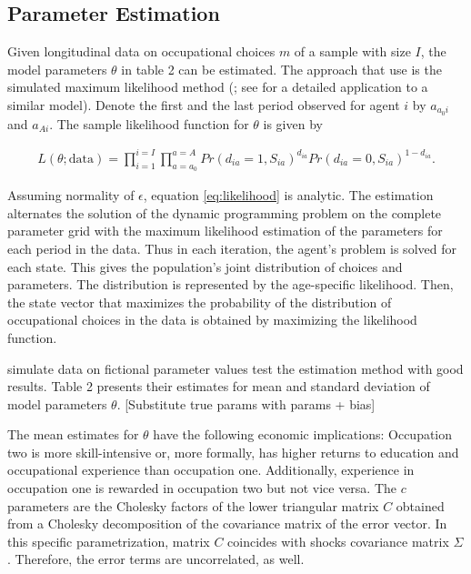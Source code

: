 \documentclass[a4paper,12pt]{article}
\begin{document}
\subsection{Parameter Estimation}

Given longitudinal data on occupational choices $m$ of a sample with size $I$, the model parameters $\theta$ in table 2 can be estimated. The approach that \cite{Keane.1994} use is the simulated maximum likelihood method (\cite{Albright.1977}; see \cite{Keane.2011d} for a detailed application to a similar model). Denote the first and the last period observed for agent $i$ by $a_{a_0 i}$ and $a_{A i}$. The sample likelihood function for $\theta$ is given by

\begin{align} \label{eq:likelihood}
L(\theta; \text{data}) = \prod_{i=1}^{i=I} \prod_{a=a_0}^{a=A} Pr(d_{ia}=1,S_{ia})^{d_{ia}}Pr(d_{ia}=0,S_{ia})^{1-d_{ia}}.
\end{align}

Assuming normality of $\epsilon$, equation \ref{eq:likelihood} is analytic. The estimation alternates the solution of the dynamic programming problem on the complete parameter grid with the maximum likelihood estimation of the parameters for each period in the data. Thus in each iteration, the agent's problem is solved for each state. This gives the population's joint distribution of choices and parameters. The distribution is represented by the age-specific likelihood. Then, the state vector that maximizes the probability of the distribution of occupational choices in the data is obtained by maximizing the likelihood function.

\cite{Keane.1994} simulate data on fictional parameter values  test the estimation method with good results. Table 2 presents their estimates for mean and standard deviation of model parameters $\theta$. [Substitute true params with params + bias]

The mean estimates for $\theta$ have the following economic implications: Occupation two is more skill-intensive or, more formally, has higher returns to education and occupational experience than occupation one. Additionally, experience in occupation one is rewarded in occupation two but not vice versa. The $c$ parameters are the Cholesky factors of the lower triangular matrix $C$ obtained from a Cholesky decomposition of the covariance matrix of the error vector. In this specific parametrization, matrix $C$ coincides with shocks covariance matrix $\Sigma$. Therefore, the error terms are uncorrelated, as well.
\end{document}
